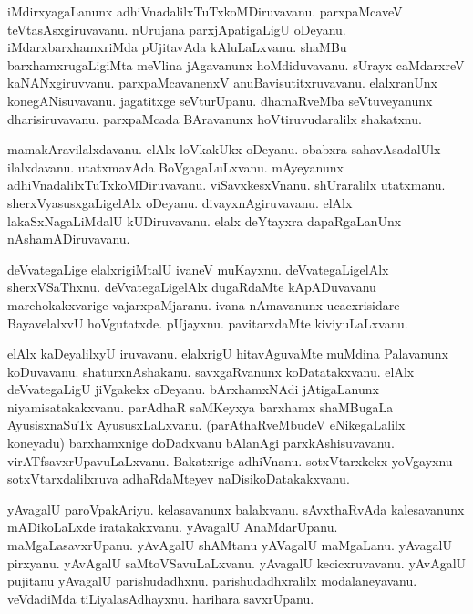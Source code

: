 \documentclass{article}
\begin{document}
\begin{mn}%
iMdirxyagaLanunx adhiVnadalilxTuTxkoMDiruvavanu. parxpaMcaveV teVtasAsxgiruvavanu. nUrujana 
parxjApatigaLigU oDeyanu. iMdarxbarxhamxriMda pUjitavAda kAluLaLxvanu. shaMBu barxhamxrugaLigiMta 
meVlina jAgavanunx hoMdiduvavanu. sUrayx caMdarxreV kaNANxgiruvvanu. parxpaMcavanenxV 
anuBavisutitxruvavanu. elalxranUnx konegANisuvavanu. jagatitxge seVturUpanu. dhamaRveMba 
seVtuveyanunx dharisiruvavanu. parxpaMcada BAravanunx hoVtiruvudaralilx shakatxnu.
\end{mn}

\begin{mn}%
mamakAravilalxdavanu. elAlx loVkakUkx oDeyanu. obabxra sahavAsadalUlx ilalxdavanu. utatxmavAda 
BoVgagaLuLxvanu. mAyeyanunx adhiVnadalilxTuTxkoMDiruvavanu. viSavxkesxVnanu. shUraralilx 
utatxmanu. sherxVyasusxgaLigelAlx oDeyanu. divayxnAgiruvavanu. elAlx lakaSxNagaLiMdalU 
kUDiruvavanu. elalx deYtayxra dapaRgaLanUnx nAshamADiruvavanu.
\end{mn}

\begin{mn}%
deVvategaLige elalxrigiMtalU ivaneV muKayxnu. deVvategaLigelAlx sherxVSaThxnu. deVvategaLigelAlx 
dugaRdaMte kApADuvavanu marehokakxvarige vajarxpaMjaranu. ivana nAmavanunx ucacxrisidare 
BayavelalxvU hoVgutatxde. pUjayxnu. pavitarxdaMte kiviyuLaLxvanu.
\end{mn}

\begin{mn}%
elAlx kaDeyalilxyU iruvavanu. elalxrigU hitavAguvaMte muMdina Palavanunx koDuvavanu. 
shaturxnAshakanu. savxgaRvanunx koDatatakxvanu. elAlx deVvategaLigU jiVgakekx oDeyanu. 
bArxhamxNAdi jAtigaLanunx niyamisatakakxvanu. parAdhaR saMKeyxya barxhamx shaMBugaLa AyusisxnaSuTx 
AyususxLaLxvanu. (parAthaRveMbudeV eNikegaLalilx koneyadu) barxhamxnige doDadxvanu bAlanAgi 
parxkAshisuvavanu. virATfsavxrUpavuLaLxvanu. Bakatxrige adhiVnanu. sotxVtarxkekx yoVgayxnu 
sotxVtarxdalilxruva adhaRdaMteyev naDisikoDatakakxvanu.
\end{mn}

\begin{mn}%
yAvagalU paroVpakAriyu. kelasavanunx balalxvanu. sAvxthaRvAda kalesavanunx mADikoLaLxde 
iratakakxvanu. yAvagalU AnaMdarUpanu. maMgaLasavxrUpanu. yAvAgalU shAMtanu yAVagalU maMgaLanu. 
yAvagalU pirxyanu. yAvAgalU saMtoVSavuLaLxvanu. yAvagalU kecicxruvavanu. yAvAgalU pujitanu 
yAvagalU parishudadhxnu. parishudadhxralilx modalaneyavanu. veVdadiMda tiLiyalasAdhayxnu. 
harihara  savxrUpanu.
\end{mn}
\end{document}
